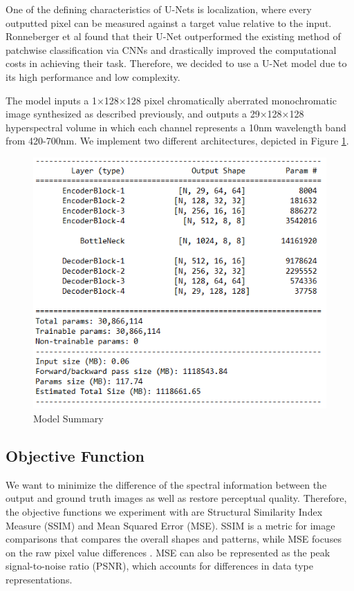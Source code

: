 \documentclass{article}
\begin{document}
One of the defining characteristics of U-Nets is localization, where every outputted pixel can be measured against a target value relative to the input. Ronneberger et al \cite{Ronneberger_2018} found that their U-Net outperformed the existing method of patchwise classification via CNNs and drastically improved the computational costs in achieving their task. Therefore, we decided to use a U-Net model due to its high performance and low complexity. 

The model inputs a 1×128×128 pixel chromatically aberrated monochromatic image synthesized as described previously, and outputs a 29×128×128 hyperspectral volume in which each channel represents a 10nm wavelength band from 420-700nm. We implement two different architectures, depicted in Figure \ref{fig:Unet_model}.


\begin{figure}
  \centering
\includegraphics[width=\textwidth]{figs/model/model_summary_shortened.png}
  \caption{Model Summary}
  \label{fig:Unet_model}
\end{figure}


\subsection{Objective Function}
We want to minimize the difference of the spectral information between the output and ground truth images as well as restore perceptual quality. Therefore, the objective functions we experiment with are Structural Similarity Index Measure (SSIM) and Mean Squared Error (MSE). SSIM is a metric for image comparisons that compares the overall shapes and patterns, while MSE focuses on the raw pixel value differences \cite{Brunet_Vrscay_Wang_2011}. MSE can also be represented as the peak signal-to-noise ratio (PSNR), which accounts for differences in data type representations.
\end{document}
